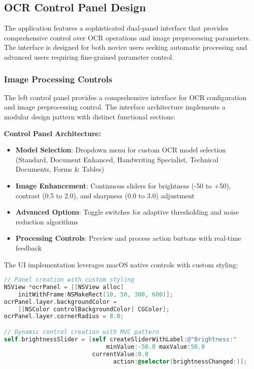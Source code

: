 \subsection{OCR Control Panel Design}

The application features a sophisticated dual-panel interface that provides comprehensive control over OCR operations and image preprocessing parameters. The interface is designed for both novice users seeking automatic processing and advanced users requiring fine-grained parameter control.

\subsubsection{Image Processing Controls}

The left control panel provides a comprehensive interface for OCR configuration and image preprocessing control. The interface architecture implements a modular design pattern with distinct functional sections:

\textbf{Control Panel Architecture:}
\begin{itemize}
\item \textbf{Model Selection}: Dropdown menu for custom OCR model selection (Standard, Document Enhanced, Handwriting Specialist, Technical Documents, Forms \& Tables)
\item \textbf{Image Enhancement}: Continuous sliders for brightness (-50 to +50), contrast (0.5 to 2.0), and sharpness (0.0 to 3.0) adjustment
\item \textbf{Advanced Options}: Toggle switches for adaptive thresholding and noise reduction algorithms
\item \textbf{Processing Controls}: Preview and process action buttons with real-time feedback
\end{itemize}

The UI implementation leverages macOS native controls with custom styling:

\begin{lstlisting}[language=C,basicstyle=\footnotesize\ttfamily,frame=single,breaklines=true,columns=flexible]
// Panel creation with custom styling
NSView *ocrPanel = [[NSView alloc] 
    initWithFrame:NSMakeRect(10, 50, 300, 600)];
ocrPanel.layer.backgroundColor = 
    [[NSColor controlBackgroundColor] CGColor];
ocrPanel.layer.cornerRadius = 8.0;

// Dynamic control creation with MVC pattern
self.brightnessSlider = [self createSliderWithLabel:@"Brightness:" 
                             minValue:-50.0 maxValue:50.0 
                         currentValue:0.0 
                               action:@selector(brightnessChanged:)];
\end{lstlisting}

